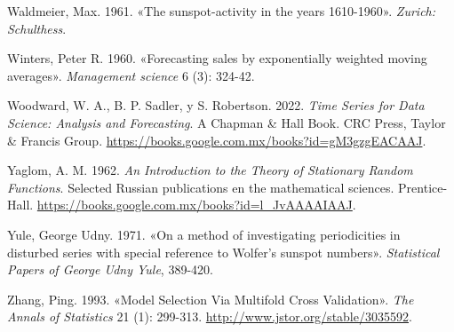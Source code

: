 \documentclass[
  us-letterpaper,
]{scrreprt}
\newlength{\cslhangindent}
\newenvironment{CSLReferences}[2] %
 {\begin{list}{}{%
  \setlength{\itemindent}{0pt}
  \setlength{\leftmargin}{0pt}
  \setlength{\parsep}{0pt}
  \ifodd #1
   \setlength{\leftmargin}{\cslhangindent}
   \setlength{\itemindent}{-1\cslhangindent}
  \fi
  \setlength{\itemsep}{#2\baselineskip}}}
 {\end{list}}
\theoremstyle{plain}
\theoremstyle{definition}
\theoremstyle{plain}
\theoremstyle{definition}
\theoremstyle{remark}
\begin{document}
\begin{CSLReferences}{1}{0}
Waldmeier, Max. 1961. {«The sunspot-activity in the years 1610-1960»}.
\emph{Zurich: Schulthess}.

Winters, Peter R. 1960. {«Forecasting sales by exponentially weighted
moving averages»}. \emph{Management science} 6 (3): 324-42.

Woodward, W. A., B. P. Sadler, y S. Robertson. 2022. \emph{Time Series
for Data Science: Analysis and Forecasting}. A Chapman \& Hall Book. CRC
Press, Taylor \& Francis Group.
\url{https://books.google.com.mx/books?id=gM3gzgEACAAJ}.

Yaglom, A. M. 1962. \emph{An Introduction to the Theory of Stationary
Random Functions}. Selected Russian publications en the mathematical
sciences. Prentice-Hall.
\url{https://books.google.com.mx/books?id=l_JvAAAAIAAJ}.

Yule, George Udny. 1971. {«On a method of investigating periodicities in
disturbed series with special reference to Wolfer's sunspot numbers»}.
\emph{Statistical Papers of George Udny Yule}, 389-420.

Zhang, Ping. 1993. {«Model Selection Via Multifold Cross Validation»}.
\emph{The Annals of Statistics} 21 (1): 299-313.
\url{http://www.jstor.org/stable/3035592}.

\end{CSLReferences}
\end{document}
